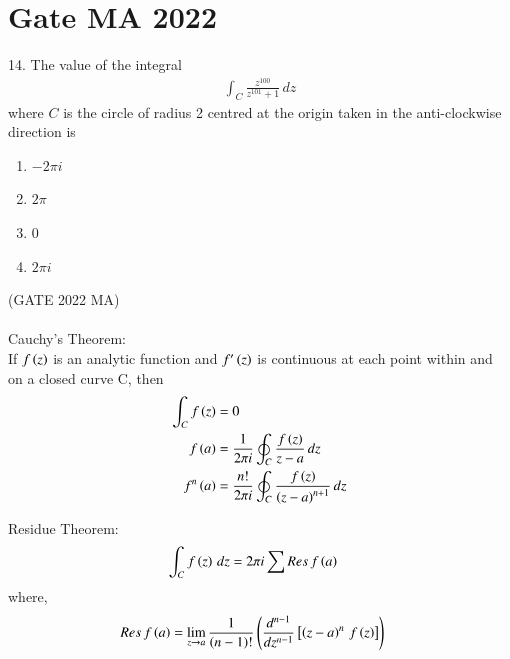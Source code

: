 \documentclass[journal,12pt,twocolumn]{IEEEtran}
\begin{document}


\vspace{3cm}

\title{}
\author{EE23BTECH11054 -  Sai Krishna Shanigarapu$^{*}$
}
\maketitle
\newpage
\bigskip

\section*{Gate MA 2022}
14. \hspace{2pt} The value of the integral 
\begin{align*}
    \int_C \frac{z^{100}}{z^{101}+1}\, dz
\end{align*}
where $C$ is the circle of radius 2 centred at the origin taken in the anti-clockwise direction is\\
\begin{enumerate}[label=(\Alph*)]
    \item $-2 \pi i$
    \item $2\pi$
    \item $0$
    \item $2\pi i $
\end{enumerate}
\hfill(GATE 2022 MA)\\
\solution\\

Cauchy's Theorem:\\
If $f\left(z\right)$ is an analytic function and $f'\left(z\right)$ is continuous at each point within and on a closed curve C, then
\begin{align}
    \int_C f\left(z\right) &= 0\\
    f\left(a\right) &= \frac{1}{2 \pi i}\oint_C\frac{f\left(z\right)}{z-a}\, dz\\
    f^{n}\left(a\right) &= \frac{n!}{2 \pi i}\oint_C\frac{f\left(z\right)}{\left(z-a\right)^{n+1}}\, dz
\end{align}

Residue Theorem:
\begin{align}
    \int_C f\left(z\right)\, dz &= 2 \pi i \sum{Res \, f\ensuremath{\left(a\right)}} \label{eq:eq1_gate_ma_2022_14_054}
\end{align}
where,
\begin{align}
    Res \, f\left(a\right) &= \lim_{z \to a}\frac{1}{\left(n-1\right)!}\left(\frac{d^{n-1}}{dz^{n-1}}{}\left[\left(z-a\right)^n\, f\left(z\right)\right]\right) \label{eq:eq2_gate_ma_2022_14_054}
\end{align}
\end{document}
